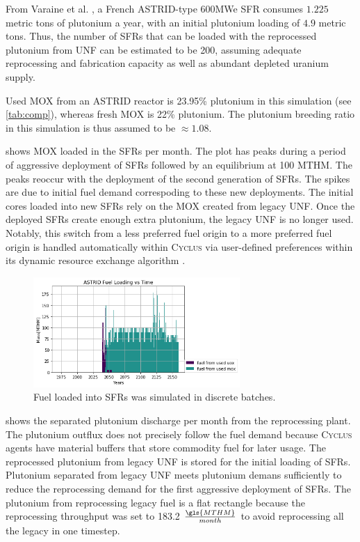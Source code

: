 \documentclass{article}
\newcommand{\Cyclus}{\textsc{Cyclus}\xspace}%
\begin{document}
From Varaine et al. \cite{varaine_pre-conceptual_2012}, a French
ASTRID-type 600\gls{MWe} \gls{SFR} consumes $1.225$ metric tons of
plutonium a year, with an initial plutonium loading of $4.9$ metric tons. 
Thus, the number of \glspl{SFR} that can be loaded with the reprocessed
plutonium from \gls{UNF} can be estimated to be 200, assuming adequate 
reprocessing and fabrication capacity as well as abundant depleted uranium 
supply.
 
Used \gls{MOX} from an ASTRID reactor is 23.95\% plutonium
in this simulation (see \cref{tab:comp}), whereas fresh \gls{MOX} is 22\% plutonium.
The plutonium breeding ratio in this simulation is thus assumed to be
$\approx 1.08$.

 shows \gls{MOX} loaded in the \glspl{SFR} per month.  The plot 
has peaks during a period of aggressive deployment of \glspl{SFR} followed by 
an equilibrium at 100 \gls{MTHM}. The peaks reoccur with the deployment of the 
second generation of \glspl{SFR}.  The spikes are due to initial fuel demand 
correspoding to these new deployments.  The initial cores loaded into new 
\glspl{SFR} rely on the \gls{MOX} created from legacy \gls{UNF}. Once the 
deployed \glspl{SFR} create enough extra plutonium, the legacy \gls{UNF} is no 
longer used. Notably, this switch from a less preferred fuel origin to a more 
preferred fuel origin is handled automatically within \Cyclus via user-defined preferences 
within its dynamic resource exchange algorithm \cite{gidden_methodology_2016}.


\begin{figure}[htbp!]
    \begin{center}
        \includegraphics[width=0.7\textwidth]{./images/french-transition/where_fuel.png}
    \end{center}
    \caption{Fuel loaded into \glspl{SFR} was simulated in discrete 
        batches.}
    \label{fig:fuel}
\end{figure}

 shows the separated plutonium discharge per month from the reprocessing plant. The plutonium outflux does not precisely follow the fuel demand because \Cyclus agents have material buffers that store commodity fuel for later usage. The reprocessed plutonium from legacy \gls{UNF} is stored for the initial loading of \glspl{SFR}.  Plutonium separated from legacy \gls{UNF} meets plutonium demans sufficiently to reduce the reprocessing demand for the first aggressive deployment of \glspl{SFR}.  The plutonium from reprocessing legacy fuel is a flat rectangle because the reprocessing throughput was set to 183.2 $\frac{\gls{MTHM}}{month}$ to avoid reprocessing all the legacy in one timestep. 
 
\end{document}
